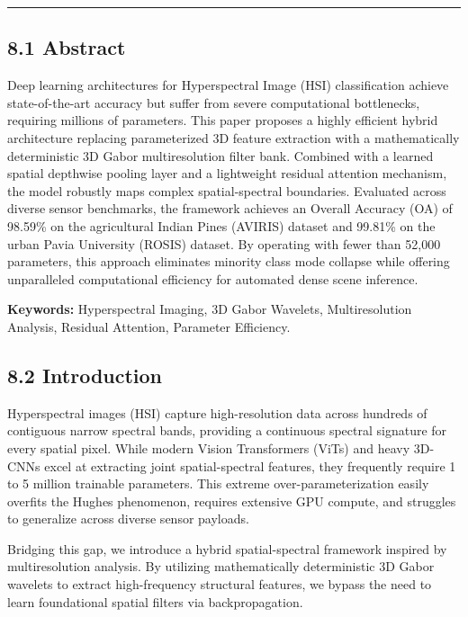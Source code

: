 \documentclass[11pt, letterpaper]{article}
\begin{document}
\hrule
\vspace{1em}

\subsection{8.1 Abstract}
Deep learning architectures for Hyperspectral Image (HSI) classification achieve state-of-the-art accuracy but suffer from severe computational bottlenecks, requiring millions of parameters. This paper proposes a highly efficient hybrid architecture replacing parameterized 3D feature extraction with a mathematically deterministic 3D Gabor multiresolution filter bank. Combined with a learned spatial depthwise pooling layer and a lightweight residual attention mechanism, the model robustly maps complex spatial-spectral boundaries. Evaluated across diverse sensor benchmarks, the framework achieves an Overall Accuracy (OA) of 98.59\% on the agricultural Indian Pines (AVIRIS) dataset and 99.81\% on the urban Pavia University (ROSIS) dataset. By operating with fewer than 52,000 parameters, this approach eliminates minority class mode collapse while offering unparalleled computational efficiency for automated dense scene inference.

\noindent\textbf{Keywords:} Hyperspectral Imaging, 3D Gabor Wavelets, Multiresolution Analysis, Residual Attention, Parameter Efficiency.

\subsection{8.2 Introduction}
Hyperspectral images (HSI) capture high-resolution data across hundreds of contiguous narrow spectral bands, providing a continuous spectral signature for every spatial pixel. While modern Vision Transformers (ViTs) and heavy 3D-CNNs excel at extracting joint spatial-spectral features, they frequently require 1 to 5 million trainable parameters. This extreme over-parameterization easily overfits the Hughes phenomenon, requires extensive GPU compute, and struggles to generalize across diverse sensor payloads.

Bridging this gap, we introduce a hybrid spatial-spectral framework inspired by multiresolution analysis. By utilizing mathematically deterministic 3D Gabor wavelets to extract high-frequency structural features, we bypass the need to learn foundational spatial filters via backpropagation.
\end{document}
